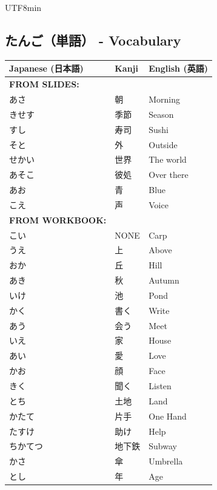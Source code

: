 \documentclass[11pt]{article}
\begin{document}
\begin{CJK}{UTF8}{min}
\subsection{たんご（単語） - Vocabulary}
\begin{tabularx}{\textwidth}{X | X | X}
    \toprule
    \textbf{Japanese (日本語)} & \textbf{Kanji} & \textbf{English (英語)} \\
    \midrule
    \textbf{FROM SLIDES:} & & \\
    あさ & 朝 & Morning \\
    きせす & 季節 & Season \\
    すし & 寿司 & Sushi \\
    そと & 外 & Outside \\
    せかい & 世界 & The world \\
    あそこ & 彼処 & Over there \\
    あお & 青 & Blue \\
    こえ & 声 & Voice \\
    \hline
    \textbf{FROM WORKBOOK:} & & \\
    こい & NONE & Carp \\
    うえ & 上 & Above \\
    おか & 丘 & Hill \\
    あき & 秋 & Autumn \\
    いけ & 池 & Pond \\
    かく & 書く & Write \\
    あう & 会う & Meet \\
    いえ & 家 & House \\
    あい & 愛 & Love \\
    かお & 顔 & Face \\
    きく & 聞く & Listen \\
    とち & 土地 & Land \\
    かたて & 片手 & One Hand \\
    たすけ & 助け & Help \\
    ちかてつ & 地下鉄 & Subway \\
    かさ & 傘 & Umbrella \\
    とし & 年 & Age \\
    \bottomrule
\end{tabularx}



\end{CJK}
\end{document}
